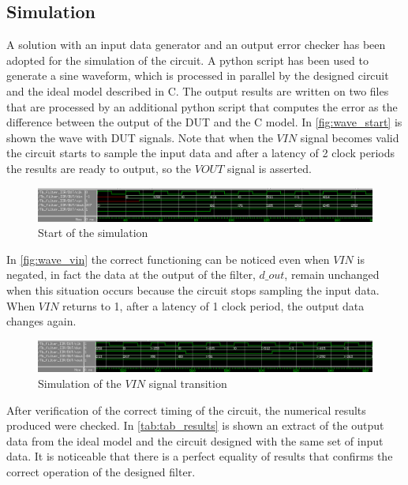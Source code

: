 \subsection{Simulation}
A solution with an input data generator and an output error checker has been adopted for the simulation of the circuit. A python script has been used to generate a sine waveform, which is processed in parallel by the designed circuit and the ideal model described in C. The output results are written on two files that are processed by an additional python script that computes the error as the difference between the output of the DUT and the C model.
In \autoref{fig:wave_start} is shown the wave with DUT signals. Note that when the $VIN$ signal becomes valid the circuit starts to sample the input data and after a latency of 2 clock periods the results are ready to output, so the $VOUT$ signal is asserted.

\begin{figure}[h]
	\center
	\includegraphics[width=1\textwidth]{images/wave_start.png}
	\caption{Start of the simulation}
	\label{fig:wave_start}
\end{figure}

In \autoref{fig:wave_vin} the correct functioning can be noticed even when $VIN$ is negated, in fact the data at the output of the filter, $d\_out$, remain unchanged when this situation occurs because the circuit stops sampling the input data. When $VIN$ returns to 1, after a latency of 1 clock period, the output data changes again.

\begin{figure}[h]
	\center
	\includegraphics[width=1\textwidth]{images/wave_vin_0_1.png}
	\caption{Simulation of the $VIN$ signal transition}
	\label{fig:wave_vin}
\end{figure}

After verification of the correct timing of the circuit, the numerical results produced were checked. In \autoref{tab:tab_results} is shown an extract of the output data from the ideal model and the circuit designed with the same set of input data. It is noticeable that there is a perfect equality of results that confirms the correct operation of the designed filter.

